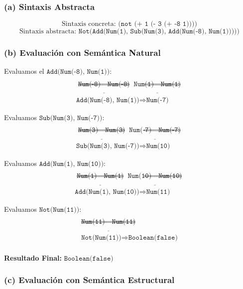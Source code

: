 \documentclass[12pt,letterpaper]{article}
\begin{document}
\subsubsection*{(a) Sintaxis Abstracta}
\[
\text{Sintaxis concreta: } \texttt{(not (+ 1 (- 3 (+ -8 1))))}
\]
\[
\text{Sintaxis abstracta: } \texttt{Not(Add(Num(1), Sub(Num(3), Add(Num(-8), Num(1)))))}
\]

\subsubsection*{(b) Evaluación con Semántica Natural}

Evaluamos el \(\texttt{Add(Num(-8), Num(1))}\):
\[
\begin{array}{c}
\\
\underline{\texttt{Num(-8)} \Rightarrow \texttt{Num(-8)}}
\underline{\texttt{Num(1)} \Rightarrow \texttt{Num(1)}} \\
\texttt{Add(Num(-8), Num(1))} \Rightarrow \texttt{Num(-7)}
\end{array}
\]

Evaluamos \(\texttt{Sub(Num(3), Num(-7))}\):
\[
\begin{array}{c}
\\
\underline{\texttt{Num(3)} \Rightarrow \texttt{Num(3)}} 
\underline{\texttt{Num(-7)} \Rightarrow \texttt{Num(-7)}} \\
\texttt{Sub(Num(3), Num(-7))} \Rightarrow \texttt{Num(10)}
\end{array}
\]

Evaluamos \(\texttt{Add(Num(1), Num(10))}\):
\[
\begin{array}{c}
\\
\underline{\texttt{Num(1)} \Rightarrow \texttt{Num(1)}}
\underline{\texttt{Num(10)} \Rightarrow \texttt{Num(10)}} \\
\texttt{Add(Num(1), Num(10))} \Rightarrow \texttt{Num(11)}
\end{array}
\]

Evaluamos \(\texttt{Not(Num(11))}\):
\[
\begin{array}{c}
\\
\underline{\texttt{Num(11)} \Rightarrow \texttt{Num(11)}} \\
\texttt{Not(Num(11))} \Rightarrow \texttt{Boolean(false)} \\
\end{array}
\]

\textbf{Resultado Final:} \(\texttt{Boolean(false)}\)

\subsubsection*{(c) Evaluación con Semántica Estructural}
\end{document}
